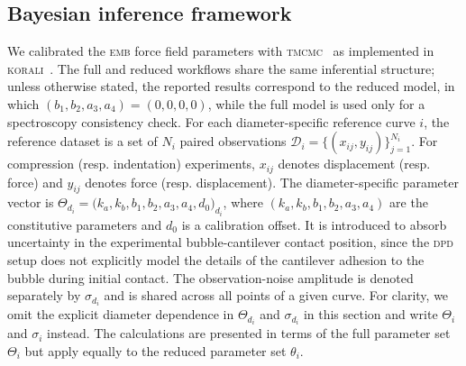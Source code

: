 \documentclass[%
 aip,
 jcp,
 amsmath,amssymb,
 preprint,%
]{revtex4-1}
\begin{document}
\subsection{Bayesian inference framework}
\label{sec:meth:bayes}

\noindent We calibrated the \textsc{emb} force field parameters with \textsc{tmcmc}~\cite{ching2007transitional} as implemented in \textsc{korali}~\cite{martin2022korali}. The full and reduced workflows share the same inferential structure; unless otherwise stated, the reported results correspond to the reduced model, in which $(b_1,b_2,a_3,a_4) = (0,0,0,0)$, while the full model is used only for a spectroscopy consistency check. For each diameter-specific reference curve $i$, the reference dataset is a set of $N_i$ paired observations $\mathcal{D}_i = \{(x_{ij}, y_{ij})\}_{j=1}^{N_i}$. For compression (resp. indentation) experiments, $x_{ij}$ denotes displacement (resp. force) and $y_{ij}$ denotes force (resp. displacement). The diameter-specific parameter vector is $\Theta_{d_i} = \bigl(k_a, k_b, b_1, b_2, a_3, a_4, d_0\bigr)_{d_i}$, where $(k_a,k_b,b_1,b_2,a_3,a_4)$ are the constitutive parameters and $d_0$ is a calibration offset. It is introduced to absorb uncertainty in the experimental bubble-cantilever contact position, since the \textsc{dpd} setup does not explicitly model the details of the cantilever adhesion to the bubble during initial contact. The observation-noise amplitude is denoted separately by $\sigma_{d_i}$ and is shared across all points of a given curve. For clarity, we omit the explicit diameter dependence in $\Theta_{d_i}$ and $\sigma_{d_i}$ in this section and write $\Theta_i$ and $\sigma_{i}$ instead. The calculations are presented in terms of the full parameter set $\Theta_i$ but apply equally to the reduced parameter set  $\theta_i$. 
\end{document}
